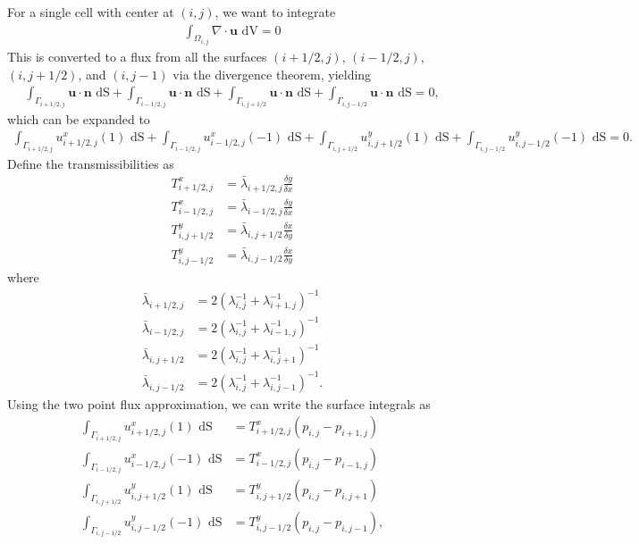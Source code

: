 \documentclass{article}
\begin{document}
For a single cell with center at $(i,j)$, we want to integrate
\begin{align}
    \int_{\Omega_{i,j}} \nabla \cdot \mathbf{u}\text{ dV} = 0
\end{align}
This is converted to a flux from all the surfaces $(i+1/2,j)$, $(i-1/2,j)$, $(i,j+1/2)$, and $(i,j-1)$ via the divergence theorem, yielding
\begin{align}
    \int_{\Gamma_{i+1/2,j}} \mathbf{u} \cdot \mathbf{n}\text{ dS} +
    \int_{\Gamma_{i-1/2,j}} \mathbf{u} \cdot \mathbf{n}\text{ dS} +
    \int_{\Gamma_{i,j+1/2}} \mathbf{u} \cdot \mathbf{n}\text{ dS} +
    \int_{\Gamma_{i,j-1/2}} \mathbf{u} \cdot \mathbf{n}\text{ dS} = 0,
\end{align}
which can be expanded to
\begin{align}
    \int_{\Gamma_{i+1/2,j}} u^x_{i+1/2,j} (1) \text{ dS} +
    \int_{\Gamma_{i-1/2,j}} u^x_{i-1/2,j} (-1) \text{ dS} +
    \int_{\Gamma_{i,j+1/2}} u^y_{i,j+1/2} (1) \text{ dS} +
    \int_{\Gamma_{i,j-1/2}} u^y_{i,j-1/2} (-1) \text{ dS} = 0.
\end{align}
Define the transmissibilities as
\begin{align}
    T^x_{i+1/2,j} &= \bar{\lambda}_{i+1/2,j} \frac{\delta y}{\delta x} \\
    T^x_{i-1/2,j} &= \bar{\lambda}_{i-1/2,j} \frac{\delta y}{\delta x} \\
    T^y_{i,j+1/2} &= \bar{\lambda}_{i,j+1/2} \frac{\delta x}{\delta y} \\
    T^y_{i,j-1/2} &= \bar{\lambda}_{i,j-1/2} \frac{\delta x}{\delta y}
\end{align}
where
\begin{align}
    \bar{\lambda}_{i+1/2,j} &= 2 \left( \lambda^{-1}_{i,j} + \lambda^{-1}_{i+1,j} \right)^{-1} \\
    \bar{\lambda}_{i-1/2,j} &= 2 \left( \lambda^{-1}_{i,j} + \lambda^{-1}_{i-1,j} \right)^{-1} \\
    \bar{\lambda}_{i,j+1/2} &= 2 \left( \lambda^{-1}_{i,j} + \lambda^{-1}_{i,j+1} \right)^{-1} \\
    \bar{\lambda}_{i,j-1/2} &= 2 \left( \lambda^{-1}_{i,j} + \lambda^{-1}_{i,j-1} \right)^{-1}.
\end{align}
Using the two point flux approximation, we can write the surface integrals as
\begin{align}
    \int_{\Gamma_{i+1/2,j}} u^x_{i+1/2,j} (1) \text{ dS} &= T^x_{i+1/2,j} (p_{i,j} - p_{i+1,j})\\
    \int_{\Gamma_{i-1/2,j}} u^x_{i-1/2,j} (-1) \text{ dS} &= T^x_{i-1/2,j} (p_{i,j} - p_{i-1,j})\\
    \int_{\Gamma_{i,j+1/2}} u^y_{i,j+1/2} (1) \text{ dS} &= T^y_{i,j+1/2} (p_{i,j} - p_{i,j+1})\\
    \int_{\Gamma_{i,j-1/2}} u^y_{i,j-1/2} (-1) \text{ dS} &= T^y_{i,j-1/2} (p_{i,j} - p_{i,j-1}),
\end{align}
\end{document}

